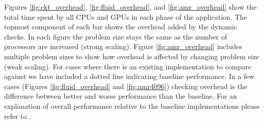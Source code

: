 Figures \ref{fig:ckt_overhead}, \ref{fig:fluid_overhead}, and \ref{fig:amr_overhead} show 
the total time spent by all CPUs and GPUs in each phase of the application.  The topmost
component of each bar shows the overhead added by the dynamic checks.  In 
each figure the problem size stays the same as the number of processors are increased
(strong scaling).  Figure \ref{fig:amr_overhead} includes multiple problem sizes to show
how overhead is affected by changing problem size (weak scaling).  For cases where there
is an existing implementation to compare against we have included a dotted line indicating
baseline performance.  In a few cases (Figures \ref{fig:fluid_overhead} and 
\ref{fig:amr4096}) checking overhead is the difference
between better and worse performance than the baseline.  For an explanation of overall
performance relative to the baseline implementations please refer to \cite{Legion12}.

